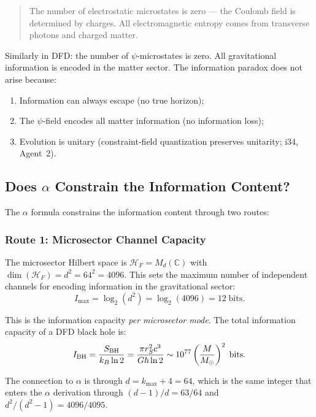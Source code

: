 \documentclass[11pt,a4paper]{article}
\begin{document}
\begin{quote}
The number of electrostatic microstates is zero --- the Coulomb field is determined by charges. All electromagnetic entropy comes from transverse photons and charged matter.
\end{quote}

Similarly in DFD: the number of $\psi$-microstates is zero. All gravitational information is encoded in the matter sector. The information paradox does not arise because:
\begin{enumerate}
\item Information can always escape (no true horizon);
\item The $\psi$-field encodes all matter information (no information loss);
\item Evolution is unitary (constraint-field quantization preserves unitarity; i34, Agent~2).
\end{enumerate}

\subsection{Does $\alpha$ Constrain the Information Content?}

The $\alpha$ formula constrains the information content through two routes:

\subsubsection{Route 1: Microsector Channel Capacity}

The microsector Hilbert space is $\mathcal{H}_F = M_d(\mathbb{C})$ with $\dim(\mathcal{H}_F) = d^2 = 64^2 = 4096$. This sets the maximum number of independent channels for encoding information in the gravitational sector:
\begin{equation}
I_{\max} = \log_2(d^2) = \log_2(4096) = 12\;\text{bits}.
\end{equation}

This is the information capacity \emph{per microsector mode}. The total information capacity of a DFD black hole is:
\begin{equation}
I_{\rm BH} = \frac{S_{\rm BH}}{k_B \ln 2} = \frac{\pi r_S^2 c^3}{G\hbar \ln 2} \sim 10^{77}\left(\frac{M}{M_\odot}\right)^2\;\text{bits}.
\end{equation}

The connection to $\alpha$ is through $d = k_{\max} + 4 = 64$, which is the same integer that enters the $\alpha$ derivation through $(d-1)/d = 63/64$ and $d^2/(d^2-1) = 4096/4095$.
\end{document}
